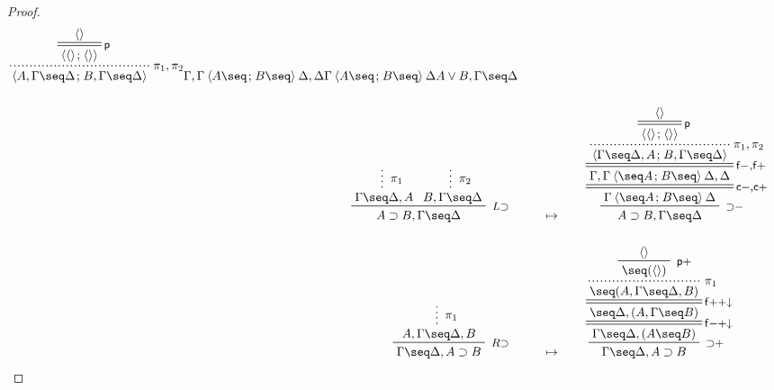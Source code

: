 \begin{proof}
\begin{align*}
{{    {\prftree[r][dotted]{$\pi_1, \pi_2$}
    {\prftree[r][d]{\rsf{p}}
    {\piq{}}
    {\piq{\piq{} \sep \piq{}}}}
    {\piq{A, \Gamma \seq \Delta \sep B, \Gamma \seq \Delta}}}
    {\Gamma, \Gamma \piq{A \seq \sep B \seq} \Delta, \Delta}}
    {\Gamma \piq{A \seq \sep B \seq} \Delta}}
    {A \lor B, \Gamma \seq \Delta}
    \\\\
    \R[L{\limp}]
      {\summ[$\pi_1$]{\Gamma \seq \Delta, A}}
      {\summ[$\pi_2$]{B, \Gamma \seq \Delta}}
      {A \limp B, \Gamma \seq \Delta}
    &\mt
    \R[\rsf{{\limp}{-}}]
    {\prftree[r][d]{\rsf{c{-}},\rsf{c{+}}}
    {\prftree[r][d]{\rsf{f{-}},\rsf{f{+}}}
    {\prftree[r][dotted]{$\pi_1, \pi_2$}
    {\prftree[r][d]{\rsf{p}}
    {\piq{}}
    {\piq{\piq{} \sep \piq{}}}}
    {\piq{\Gamma \seq \Delta, A \sep B, \Gamma \seq \Delta}}}
    {\Gamma, \Gamma \piq{\seq A \sep B \seq} \Delta, \Delta}}
    {\Gamma \piq{\seq A \sep B \seq} \Delta}}
    {A \limp B, \Gamma \seq \Delta}
    \\\\
    \R[R{\limp}]
      {\summ[$\pi_1$]{A, \Gamma \seq \Delta, B}}
      {\Gamma \seq \Delta, A \limp B}
    &\mt
    \R[\rsf{{\limp}{+}}]
    {\prftree[r][d]{\rsf{f{-}{+}{\da}}}
    {\prftree[r][d]{\rsf{f{+}{+}{\da}}}
    {\prftree[r][dotted]{$\pi_1$}
    {\R[\rsf{p{+}}]
    {\piq{}}
    {\seq (\piq{})}}
    {\seq (A, \Gamma \seq \Delta, B)}}
    {\seq \Delta, (A, \Gamma \seq B)}}
    {\Gamma \seq \Delta, (A \seq B)}}
    {\Gamma \seq \Delta, A \limp B}
  \end{align*}
\end{proof}
